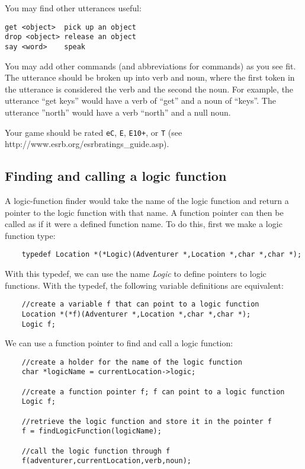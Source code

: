 \documentclass[12pt]{article}
\begin{document}
You may find other utterances useful:

\begin{verbatim}
get <object>  pick up an object
drop <object> release an object
say <word>    speak
\end{verbatim}

You may add other commands (and abbreviations for commands)
as you see fit. The utterance should be broken up into verb and noun,
where the first token in the utterance
is considered the verb and the second the noun.
For example, the utterance ``get keys'' would have a verb of
``get'' and a noun of ``keys''. The utterance ''north'' would have
a verb ``north'' and a null noun.

Your game should be rated \verb!eC!, \verb!E!, \verb!E10+!, or \verb!T!
(see 
           {http://www.esrb.org/esrbratings\_guide.asp}).

\subsection*{Finding and calling a logic function}

A logic-function finder would take the name of the logic
function and return a pointer to the logic function with that name.
A function
pointer can then
be called as if it were a defined function name. To do this,
first we make a logic function type:

\begin{verbatim}
    typedef Location *(*Logic)(Adventurer *,Location *,char *,char *);
\end{verbatim}

With this typedef, we can use the name {\it Logic} to define pointers
to logic functions. With the typedef,
the following variable definitions are
equivalent:

\begin{verbatim}
    //create a variable f that can point to a logic function
    Location *(*f)(Adventurer *,Location *,char *,char *);
    Logic f;
\end{verbatim}

We can use a function pointer to find and call a logic function:

\begin{verbatim}
    //create a holder for the name of the logic function
    char *logicName = currentLocation->logic;

    //create a function pointer f; f can point to a logic function
    Logic f;

    //retrieve the logic function and store it in the pointer f
    f = findLogicFunction(logicName);

    //call the logic function through f
    f(adventurer,currentLocation,verb,noun);
\end{verbatim}
\end{document}
